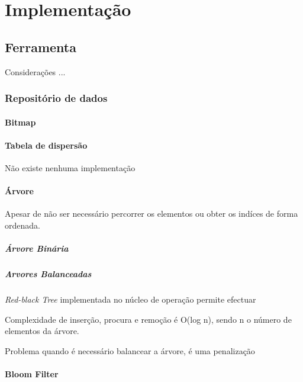 \chapter{Implementação}
\label{cap:Implementacao}

\section{Ferramenta}
Considerações ...

\subsection{Repositório de dados}


\subsubsection{Bitmap}

\subsubsection{Tabela de dispersão}
Não existe nenhuma implementação 

\subsubsection{Árvore}
Apesar de não ser necessário percorrer os elementos ou obter os indíces de
forma ordenada. 

\paragraph{Árvore Binária}


\paragraph{Arvores Balanceadas}
\textit{Red-black Tree} implementada no núcleo de operação permite efectuar

Complexidade de inserção, procura e remoção é O(log n), sendo n o número de
elementos da árvore.

Problema quando é necessário balancear a árvore, é uma penalização

\subsubsection{Bloom Filter}
